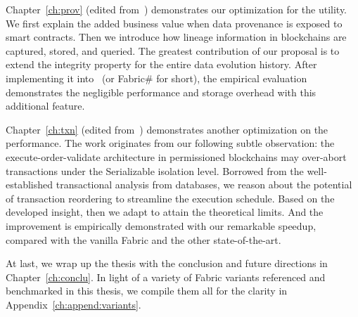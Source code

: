 Chapter~\ref{ch:prov} (edited from~\cite{ruan2019fine}) demonstrates our optimization for the utility. 
We first explain the added business value when data provenance is exposed to smart contracts. 
Then we introduce how lineage information in blockchains are captured, stored, and queried. 
The greatest contribution of our proposal is to extend the integrity property for the entire data evolution history. 
After implementing it into {\fs}~(or Fabric\# for short), the empirical evaluation demonstrates the negligible performance and storage overhead with this additional feature. 

Chapter~\ref{ch:txn} (edited from~\cite{ruan2020transactional}) demonstrates another optimization on the performance. 
The work originates from our following subtle observation:
the execute-order-validate architecture in permissioned blockchains may over-abort transactions under the Serializable isolation level. 
Borrowed from the well-established transactional analysis from databases, we reason about the potential of transaction reordering to streamline the execution schedule. Based on the developed insight, then we adapt {\fs} to attain the theoretical limits. 
And the improvement is empirically demonstrated with our remarkable speedup, compared with the vanilla Fabric and the other state-of-the-art. 

At last, we wrap up the thesis with the conclusion and future directions in Chapter~\ref{ch:conclu}. 
In light of a variety of Fabric variants referenced and benchmarked in this thesis, we compile them all for the clarity in Appendix~\ref{ch:append:variants}. 

